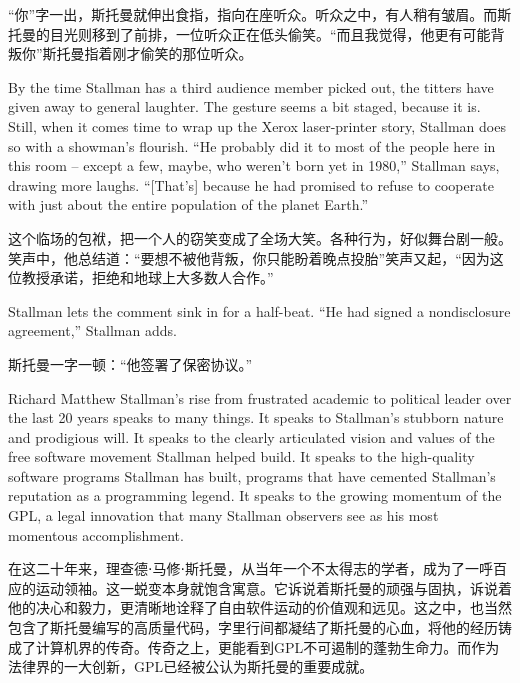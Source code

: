 \ifdefined\chs
``你''字一出，斯托曼就伸出食指，指向在座听众。听众之中，有人稍有皱眉。而斯托曼的目光则移到了前排，一位听众正在低头偷笑。``而且我觉得，他更有可能背叛你''斯托曼指着刚才偷笑的那位听众。
\fi

\ifdefined\eng
By the time Stallman has a third audience member picked out, the titters have given away to general laughter. The gesture seems a bit staged, because it is. Still, when it comes time to wrap up the Xerox laser-printer story, Stallman does so with a showman's flourish. ``He probably did it to most of the people here in this room -- except a few, maybe, who weren't born yet in 1980,'' Stallman says, drawing more laughs. ``[That's] because he had promised to refuse to cooperate with just about the entire population of the planet Earth.''
\fi

\ifdefined\chs
这个临场的包袱，把一个人的窃笑变成了全场大笑。各种行为，好似舞台剧一般。笑声中，他总结道：``要想不被他背叛，你只能盼着晚点投胎''笑声又起，``因为这位教授承诺，拒绝和地球上大多数人合作。''
\fi

\ifdefined\eng
Stallman lets the comment sink in for a half-beat. ``He had signed a nondisclosure agreement,'' Stallman adds.
\fi

\ifdefined\chs
斯托曼一字一顿：``他签署了保密协议。''
\fi

\ifdefined\eng
Richard Matthew Stallman's rise from frustrated academic to political leader over the last 20 years speaks to many things. It speaks to Stallman's stubborn nature and prodigious will. It speaks to the clearly articulated vision and values of the free software movement Stallman helped build. It speaks to the high-quality software programs Stallman has built, programs that have cemented Stallman's reputation as a programming legend. It speaks to the growing momentum of the GPL, a legal innovation that many Stallman observers see as his most momentous accomplishment.
\fi

\ifdefined\chs
在这二十年来，理查德⋅马修⋅斯托曼，从当年一个不太得志的学者，成为了一呼百应的运动领袖。这一蜕变本身就饱含寓意。它诉说着斯托曼的顽强与固执，诉说着他的决心和毅力，更清晰地诠释了自由软件运动的价值观和远见。这之中，也当然包含了斯托曼编写的高质量代码，字里行间都凝结了斯托曼的心血，将他的经历铸成了计算机界的传奇。传奇之上，更能看到GPL不可遏制的蓬勃生命力。而作为法律界的一大创新，GPL已经被公认为斯托曼的重要成就。
\fi

